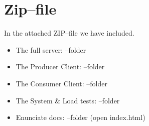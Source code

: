 \chapter{Zip--file}\label{app:zip_file}
In the attached ZIP--file we have included.
\begin{itemize}
	\item The full server: --folder
	\item The Producer Client: --folder
	\item The Consumer Client: --folder
	\item The System \& Load tests: --folder
	\item Enunciate docs: --folder (open index.html)
\end{itemize}
